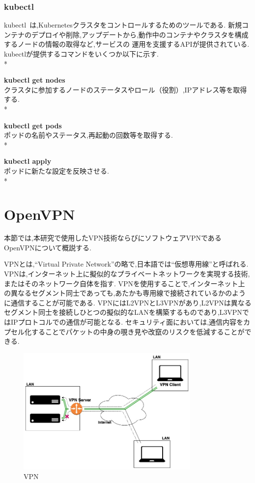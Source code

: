 \subsubsection{kubectl}
\label{background:container-orchestration-system:kubernetes:kubectl}

kubectl~\cite{kubectl}は,Kubernetesクラスタをコントロールするためのツールである.
新規コンテナのデプロイや削除,アップデートから,動作中のコンテナやクラスタを構成するノードの情報の取得など,サービスの
運用を支援するAPIが提供されている.
kubectlが提供するコマンドをいくつか以下に示す.\\*

{\bf kubectl get nodes}\\
クラスタに参加するノードのステータスやロール（役割）,IPアドレス等を取得する.\\*

{\bf kubectl get pods}\\
ポッドの名前やステータス,再起動の回数等を取得する.\\*

{\bf kubectl apply}\\
ポッドに新たな設定を反映させる.\\*

\section{OpenVPN}
\label{background:openvpn}

本節では,本研究で使用したVPN技術ならびにソフトウェアVPNであるOpenVPNについて概説する.

VPNとは,``Virtual Private Network''の略で,日本語では``仮想専用線''と呼ばれる.
VPNは,インターネット上に擬似的なプライベートネットワークを実現する技術,またはそのネットワーク自体を指す.
VPNを使用することで,インターネット上の異なるセグメント同士であっても,あたかも専用線で接続されているかのように通信することが可能である.
VPNにはL2VPNとL3VPNがあり,L2VPNは異なるセグメント同士を接続しひとつの擬似的なLANを構築するものであり,L3VPNではIPプロトコルでの通信が可能となる.
セキュリティ面においては,通信内容をカプセル化することでパケットの中身の覗き見や改竄のリスクを低減することができる.

\begin{figure}[htbp]
\begin{center}
    \includegraphics[width=0.8\textwidth]{./figures/openvpn.jpg}
    \caption{VPN}
\end{center}
\end{figure}

